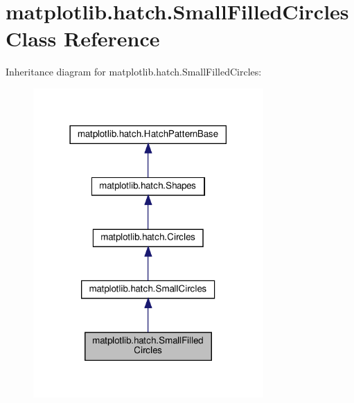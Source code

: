 \hypertarget{classmatplotlib_1_1hatch_1_1SmallFilledCircles}{}\section{matplotlib.\+hatch.\+Small\+Filled\+Circles Class Reference}
\label{classmatplotlib_1_1hatch_1_1SmallFilledCircles}


Inheritance diagram for matplotlib.\+hatch.\+Small\+Filled\+Circles\+:
\nopagebreak
\begin{figure}[H]
\begin{center}
\leavevmode
\includegraphics[width=249pt]{classmatplotlib_1_1hatch_1_1SmallFilledCircles__inherit__graph}
\end{center}
\end{figure}


